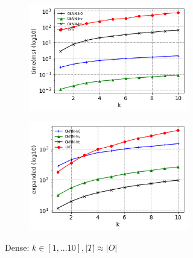 \begin{figure}[!htb]
  \begin{subfigure}{\linewidth}
    \begin{subfigure}{0.5\textwidth}
        \centering
        \includegraphics[width=.9\textwidth]{pic/e2_dense_time.png}
        \caption{}
        \label{e2_dense_time}
    \end{subfigure}%
    \hfill
    \begin{subfigure}{0.5\textwidth}
        \centering
        \includegraphics[width=.9\textwidth]{pic/e2_dense_gen.png}
        \caption{}
        \label{e2_dense_gen}
    \end{subfigure}
    \caption*{\small Dense: $k \in [1,...10], |T| \approx |O|$}
  \end{subfigure}\par\medskip
  \begin{subfigure}{\linewidth}
    \begin{subfigure}{0.5\textwidth}
        \centering

\end{subfigure}
\end{subfigure}
\end{figure}
